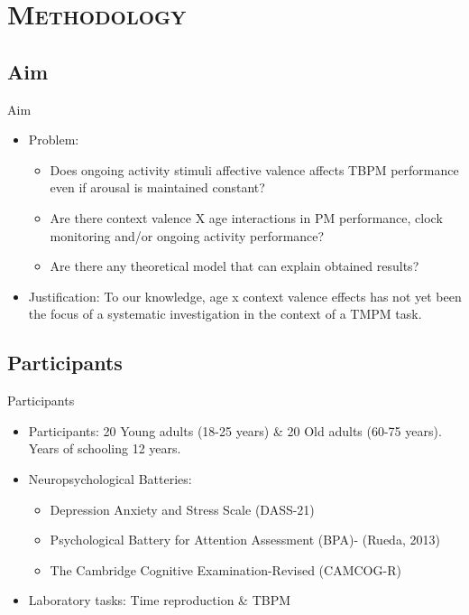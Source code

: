 \documentclass[xcolor=x11names,compress]{beamer}
\renewcommand{\(}{\begin{columns}}
\renewcommand{\)}{\end{columns}}
\newcommand{\<}[1]{\begin{column}{#1}}
\renewcommand{\>}{\end{column}}
\begin{document}
\section{\scshape Methodology}
\subsection{Aim}
\begin{frame}{Aim}
\begin{itemize}
\item Problem:
\begin{itemize}
\item Does ongoing activity stimuli affective valence affects TBPM performance even if arousal is maintained constant?

\item Are there context valence X age interactions in PM performance, clock monitoring and/or ongoing activity performance?

\item Are there any theoretical model that can explain obtained results?
\end{itemize}

\item Justification: To our knowledge, age x context valence effects has not yet been the focus of a systematic investigation in the context of a TMPM task.
\end{itemize}
\end{frame}



\subsection{Participants}
\begin{frame}{Participants}
\begin{itemize}
\item Participants: 20 Young adults (18-25 years) \& 20 Old adults (60-75 years). Years of schooling 12 years.
\item Neuropsychological Batteries:
	\begin{itemize}
	\item Depression Anxiety and Stress Scale (DASS-21) 
	\item Psychological Battery for Attention Assessment (BPA)- (Rueda, 2013)
	\item The Cambridge Cognitive Examination-Revised (CAMCOG-R)
	\end{itemize}
\item Laboratory tasks: Time reproduction \& TBPM
\end{itemize}
\end{frame}
\end{document}
